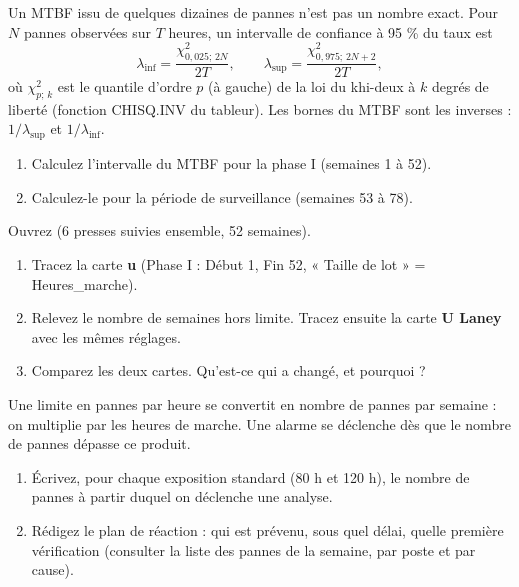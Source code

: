 \documentclass[10pt,a4paper]{article}
\begin{document}
Un MTBF issu de quelques dizaines de pannes n'est pas un nombre exact. Pour $N$ pannes observées sur $T$ heures, un intervalle de confiance à 95 \% du taux est
$$\lambda_{\text{inf}} = \frac{\chi^2_{0{,}025;\,2N}}{2T}, \qquad \lambda_{\text{sup}} = \frac{\chi^2_{0{,}975;\,2N+2}}{2T},$$
où $\chi^2_{p;\,k}$ est le quantile d'ordre $p$ (à gauche) de la loi du khi-deux à $k$ degrés de liberté (fonction \textsf{CHISQ.INV} du tableur). Les bornes du MTBF sont les inverses : $1/\lambda_{\text{sup}}$ et $1/\lambda_{\text{inf}}$.
\begin{enumerate}[label=\textcolor{cyan}{\textbf{\arabic*.}},leftmargin=15pt,itemsep=1.5pt]
\item Calculez l'intervalle du MTBF pour la phase I (semaines 1 à 52).
\item Calculez-le pour la période de surveillance (semaines 53 à 78).
\end{enumerate}

 \tagE
Ouvrez  (6 presses suivies ensemble, 52 semaines).
\begin{enumerate}[label=\textcolor{cyan}{\textbf{\arabic*.}},leftmargin=15pt,itemsep=1.5pt]
\item Tracez la carte \textbf{u} (Phase I : Début 1, Fin 52, « Taille de lot » = Heures\_marche).
\item Relevez le nombre de semaines hors limite. Tracez ensuite la carte \textbf{U Laney} avec les mêmes réglages.
\item Comparez les deux cartes. Qu'est-ce qui a changé, et pourquoi ?
\end{enumerate}

Une limite en pannes par heure se convertit en nombre de pannes par semaine : on multiplie par les heures de marche. Une alarme se déclenche dès que le nombre de pannes dépasse ce produit.
\begin{enumerate}[label=\textcolor{cyan}{\textbf{\arabic*.}},leftmargin=15pt,itemsep=1.5pt]
\item Écrivez, pour chaque exposition standard (80 h et 120 h), le nombre de pannes à partir duquel on déclenche une analyse.
\item Rédigez le plan de réaction : qui est prévenu, sous quel délai, quelle première vérification (consulter la liste des pannes de la semaine, par poste et par cause).
\end{enumerate}
\end{document}
